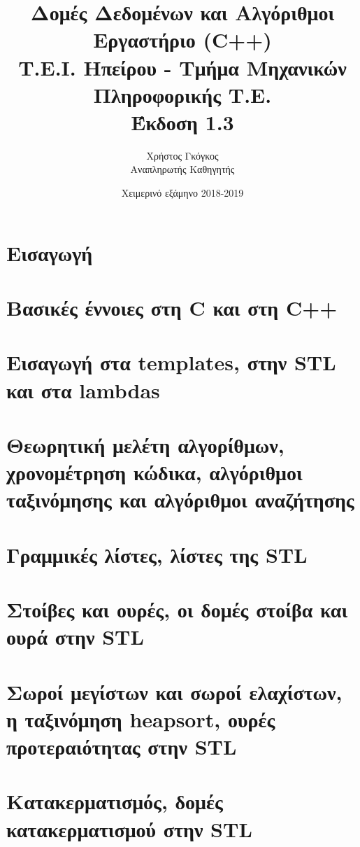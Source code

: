 \documentclass[11pt,a4paper,twoside,openany]{book}
\title{Δομές Δεδομένων και Αλγόριθμοι \\ Εργαστήριο (C++)\\ Τ.Ε.Ι. Ηπείρου - Τμήμα Μηχανικών Πληροφορικής Τ.Ε. \\ Έκδοση 1.3}
\author{Χρήστος Γκόγκος  \\ Αναπληρωτής Καθηγητής }
\date{Χειμερινό εξάμηνο 2018-2019}
\begin{document}
\frontmatter
\maketitle
\tableofcontents
\mainmatter

\chapter*{Εισαγωγή}


\chapter{Βασικές έννοιες στη C και στη C++}


\chapter{Εισαγωγή στα templates, στην STL και στα lambdas}


\chapter{Θεωρητική μελέτη αλγορίθμων, χρονομέτρηση κώδικα, αλγόριθμοι ταξινόμησης και αλγόριθμοι αναζήτησης}


\chapter{Γραμμικές λίστες, λίστες της STL}


\chapter{Στοίβες και ουρές, οι δομές στοίβα και ουρά στην STL}


\chapter{Σωροί μεγίστων και σωροί ελαχίστων, η ταξινόμηση heapsort, ουρές προτεραιότητας στην STL}


\chapter{Κατακερματισμός, δομές κατακερματισμού στην STL}

\end{document}
